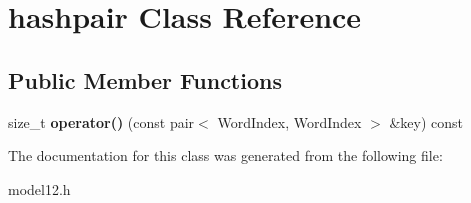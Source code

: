 \hypertarget{classhashpair}{\section{hashpair \-Class \-Reference}
\label{classhashpair}
}
\subsection*{\-Public \-Member \-Functions}
\begin{DoxyCompactItemize}
\item 
\hypertarget{classhashpair_a43d49b3fcc2646f1f4a041e1e29e81e6}{size\-\_\-t {\bfseries operator()} (const pair$<$ \-Word\-Index, \-Word\-Index $>$ \&key) const }\label{classhashpair_a43d49b3fcc2646f1f4a041e1e29e81e6}

\end{DoxyCompactItemize}


\-The documentation for this class was generated from the following file\-:\begin{DoxyCompactItemize}
\item 
model12.\-h\end{DoxyCompactItemize}
